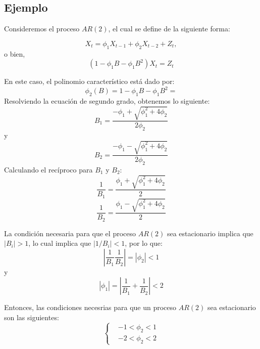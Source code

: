 \documentclass[10pt,a4paper]{article}
\begin{document}
\subsection{Ejemplo}

Consideremos el proceso $AR(2)$, el cual se define de la siguiente forma:

\begin{equation}
	X_t=\phi_1 X_{t-1}+\phi_2 X_{t-2}+ Z_t,
\end{equation}
o bien,
\begin{equation}
	(1-\phi_1 B -\phi_1 B^{2})X_t = Z_t
\end{equation}

En este caso, el polinomio característico está dado por:
\begin{equation}
	\phi_2(B) = 1-\phi_1 B -\phi_1 B^{2} = 
\end{equation}
Resolviendo la ecuación de segundo grado, obtenemos lo siguiente:
\begin{equation}
	B_1 = \frac{- \phi_{1}+ \sqrt{\phi_{1}^2+4\phi_{2}}}{2\phi_{2}}
\end{equation}
 y
 \begin{equation}
 	B_2 = \frac{- \phi_{1}- \sqrt{\phi_{1}^2+4\phi_{2}}}{2\phi_{2}}
 \end{equation}
Calculando el recíproco para $B_1$ y $B_2$:
 \begin{equation}
	\frac{1}{B_1} = \frac{\phi_{1}+ \sqrt{\phi_{1}^2+4\phi_{2}}}{2}
\end{equation}
 \begin{equation}
	\frac{1}{B_2} = \frac{\phi_{1}- \sqrt{\phi_{1}^2+4\phi_{2}}}{2}
\end{equation}

La condición necesaria para que el proceso $AR(2)$ sea estacionario implica que $|B_i| > 1$, lo cual implica que $|1/B_i| < 1$, por lo que:
\begin{equation}
	\left |  \frac{1}{B_1}\frac{1}{B_2} \right | = |\phi_2|<1 
\end{equation}
y
\begin{equation}
	|\phi_1| = \left |  \frac{1}{B_1}+\frac{1}{B_2} \right | < 2
\end{equation}

Entonces, las condiciones necesrias para que un proceso $AR(2)$ sea estacionario son las siguientes:
\begin{equation}
	\begin{cases}
		& -1 < \phi_2 < 1\\
		&-2 < \phi_2 < 2
	\end{cases}
\end{equation}
\end{document}
